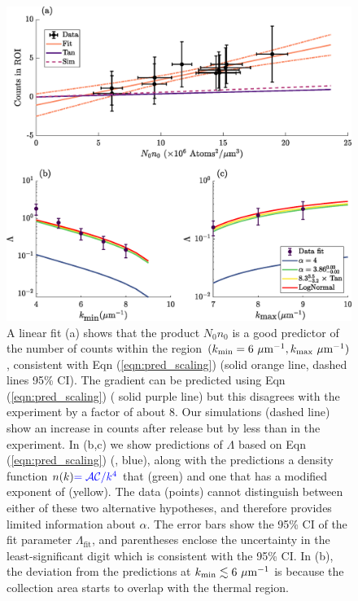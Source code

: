 	\begin{figure}
	\begin{center}
		\includegraphics[width=\columnwidth]{fig/QD/exp_results_plus}
			\caption{ A linear fit (a) shows that the product $N_0n_0$ is a good predictor of the number of counts within the region $(k_\textrm{min}=6~\mu\textrm{m}^{-1},k_\textrm{max}~\mu\textrm{m}^{-1})$, consistent with Eqn (\ref{eqn:pred_scaling}) 
			(solid orange line, dashed lines 95\% CI). The gradient \blu{$\Lambda$} %
			 can be predicted using Eqn (\ref{eqn:pred_scaling}) ( solid purple line) but this disagrees with the experiment by a factor of about 8. Our simulations (dashed line) show an increase in counts after release but by less than in the experiment. 
			In (b,c) we show predictions of $\Lambda$ based on Eqn (\ref{eqn:pred_scaling}) (, blue), along with the predictions  a density function $n(k){\color{blue}{=\mathcal{AC}/k^4}}$ that  %
			(green) and one that has %
			a modified exponent of  (yellow). 
			The  data  (points) cannot distinguish between either of these two alternative hypotheses, and therefore provides limited information about %
			$\alpha$.
			The error bars show the 95\% CI of the fit parameter $\Lambda_\textrm{fit}$, and parentheses enclose the uncertainty in the least-significant digit which is consistent with the 95\% CI.
			In (b), the deviation from the predictions at $k_\textrm{min}\lesssim6~\mu\textrm{m}^{-1}$ is because the collection area starts to overlap with the thermal region.
			}


\end{center}
\end{figure}
